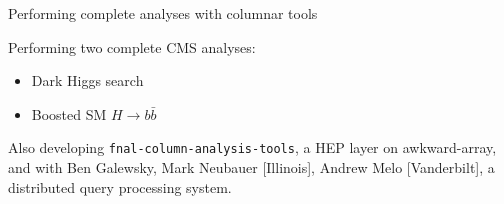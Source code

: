 \documentclass[aspectratio=169]{beamer}
\begin{document}
\begin{frame}{Performing complete analyses with columnar tools}
\begin{center}
\begin{minipage}{0.65\linewidth}
\large Performing two complete CMS analyses:
\begin{itemize}
\item Dark Higgs search
\item Boosted SM $H \to b\bar{b}$
\end{itemize}
\end{minipage}
\end{center}

\vspace{0.25 cm}
Also developing {\tt fnal-column-analysis-tools}, a HEP layer on awkward-array,
and with Ben Galewsky, Mark Neubauer [Illinois], Andrew Melo [Vanderbilt], a distributed query processing system.
\end{frame}
\end{document}
